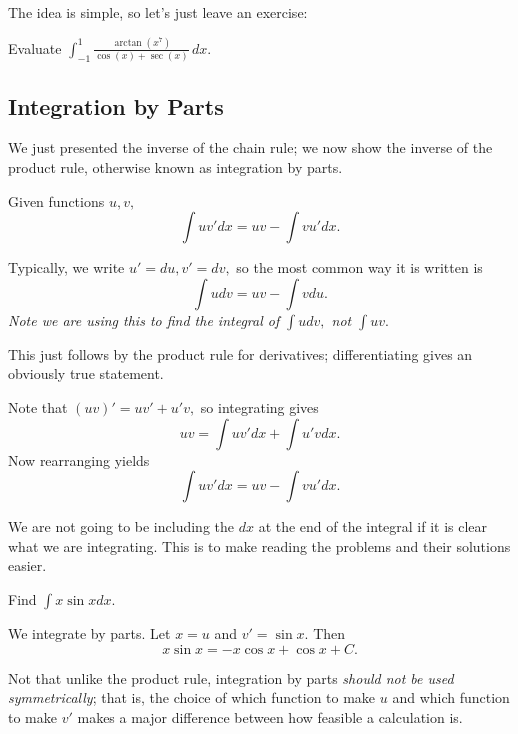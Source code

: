 \documentclass[mast]{lucky}
\begin{document}
The idea is simple, so let's just leave an exercise:

\begin{exer}
Evaluate $\int_{-1}^1 \frac{\arctan(x^7)}{\cos(x)+\sec(x)}\,dx$.
\end{exer}

\subsection{Integration by Parts}

We just presented the inverse of the chain rule; we now show the inverse of the product rule, otherwise known as integration by parts.

\begin{theo}
Given functions $u,v,$
\[\int uv'dx= uv-\int vu'dx.\]
\end{theo}

\begin{remark}
Typically, we write $u'=du,v'=dv,$ so the most common way it is written is
\[\int udv = uv-\int vdu.\]
\emph{Note we are using this to find the integral of $\int udv,$ not $\int uv.$}
\end{remark}

This just follows by the product rule for derivatives; differentiating gives an obviously true statement.

\begin{pro}
Note that $(uv)'=uv'+u'v,$ so integrating gives
\[uv=\int uv'dx+\int u'vdx.\]
Now rearranging yields
\[\int uv'dx= uv-\int vu'dx.\]
\end{pro}

We are not going to be including the $dx$ at the end of the integral if it is clear what we are integrating. This is to make reading the problems and their solutions easier.

\begin{exam}
Find $\int x\sin xdx.$
\end{exam}

\begin{sol}
We integrate by parts. Let $x=u$ and $v'=\sin x.$ Then
\[x\sin x = -x\cos x+\cos x+C.\]
\end{sol}

\begin{remark}
Not that unlike the product rule, integration by parts \emph{should not be used symmetrically}; that is, the choice of which function to make $u$ and which function to make $v'$ makes a major difference between how feasible a calculation is.
\end{remark}
\end{document}

